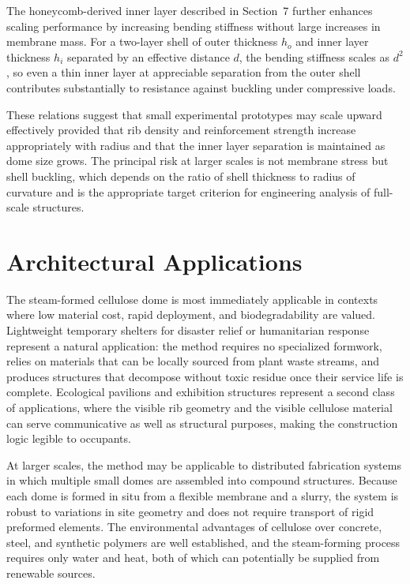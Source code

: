 \documentclass[12pt,a4paper]{article}
\begin{document}
The honeycomb-derived inner layer described in Section~7 further
enhances scaling performance by increasing bending stiffness without
large increases in membrane mass. For a two-layer shell of outer
thickness $h_o$ and inner layer thickness $h_i$ separated by an
effective distance $d$, the bending stiffness scales as $d^2$, so
even a thin inner layer at appreciable separation from the outer shell
contributes substantially to resistance against buckling under
compressive loads.

These relations suggest that small experimental prototypes may scale
upward effectively provided that rib density and reinforcement strength
increase appropriately with radius and that the inner layer separation
is maintained as dome size grows. The principal risk at larger scales
is not membrane stress but shell buckling, which depends on the ratio
of shell thickness to radius of curvature and is the appropriate
target criterion for engineering analysis of full-scale structures.

\section{Architectural Applications}

The steam-formed cellulose dome is most immediately applicable in
contexts where low material cost, rapid deployment, and biodegradability
are valued. Lightweight temporary shelters for disaster relief or
humanitarian response represent a natural application: the method
requires no specialized formwork, relies on materials that can be
locally sourced from plant waste streams, and produces structures that
decompose without toxic residue once their service life is complete.
Ecological pavilions and exhibition structures represent a second class
of applications, where the visible rib geometry and the visible
cellulose material can serve communicative as well as structural
purposes, making the construction logic legible to occupants.

At larger scales, the method may be applicable to distributed
fabrication systems in which multiple small domes are assembled into
compound structures. Because each dome is formed in situ from a
flexible membrane and a slurry, the system is robust to variations in
site geometry and does not require transport of rigid preformed elements.
The environmental advantages of cellulose over concrete, steel, and
synthetic polymers are well established, and the steam-forming process
requires only water and heat, both of which can potentially be supplied
from renewable sources.
\end{document}
